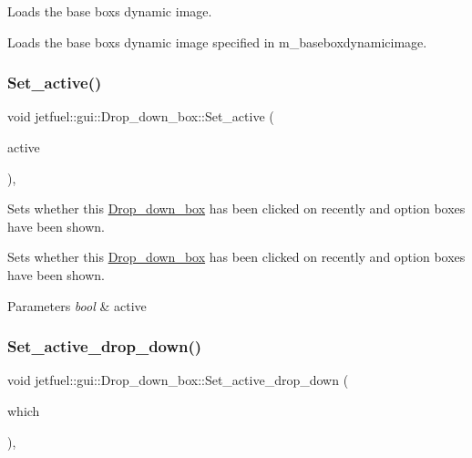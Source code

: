 Loads the base box\textquotesingle{}s dynamic image. 

Loads the base box\textquotesingle{}s dynamic image specified in m\+\_\+baseboxdynamicimage. \mbox{\label{classjetfuel_1_1gui_1_1Drop__down__box_a0a52de8d01db19c0600f3060ad3c444d}} 
\subsubsection{\texorpdfstring{Set\+\_\+active()}{Set\_active()}}
{\footnotesize\ttfamily void jetfuel\+::gui\+::\+Drop\+\_\+down\+\_\+box\+::\+Set\+\_\+active (\begin{DoxyParamCaption}\item[{const bool}]{active }\end{DoxyParamCaption})\hspace{0.3cm}{\ttfamily [inline]}, {\ttfamily [protected]}}



Sets whether this \hyperlink{classjetfuel_1_1gui_1_1Drop__down__box}{Drop\+\_\+down\+\_\+box} has been clicked on recently and option boxes have been shown. 

Sets whether this \hyperlink{classjetfuel_1_1gui_1_1Drop__down__box}{Drop\+\_\+down\+\_\+box} has been clicked on recently and option boxes have been shown.


\begin{DoxyParams}{Parameters}
{\em bool} & active \\
\hline
\end{DoxyParams}
\mbox{\label{classjetfuel_1_1gui_1_1Drop__down__box_af9d4d77418cc67a85dc98519224458f4}} 
\subsubsection{\texorpdfstring{Set\+\_\+active\+\_\+drop\+\_\+down()}{Set\_active\_drop\_down()}}
{\footnotesize\ttfamily void jetfuel\+::gui\+::\+Drop\+\_\+down\+\_\+box\+::\+Set\+\_\+active\+\_\+drop\+\_\+down (\begin{DoxyParamCaption}\item[{const size\+\_\+t}]{which }\end{DoxyParamCaption})\hspace{0.3cm}{\ttfamily [inline]}, {\ttfamily [protected]}}



